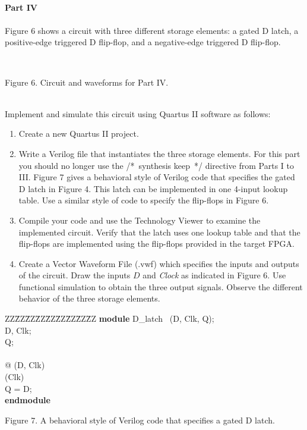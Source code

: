 \documentclass[epsfig,10pt,fullpage]{article}
\begin{document}
~\\
\noindent
{\bf Part IV}
~\\
~\\
\noindent
Figure 6 shows a circuit with three different storage elements: a gated D latch, 
a positive-edge triggered D flip-flop, and a negative-edge triggered D flip-flop.
~\\

\begin{figure}[H]
\scriptsize
\centerline{
\hbox{}}
\end{figure}
~\\
\centerline{Figure 6.  Circuit and waveforms for Part IV.}
~\\

\noindent
Implement and simulate this circuit using Quartus II software as follows:
\begin{enumerate}
\item Create a new Quartus II project. 
\item Write a Verilog file that instantiates the three storage elements. For this part you
should no longer use the /*~synthesis keep~*/ directive from Parts I to III. Figure 7
gives a behavioral style of Verilog code that specifies the gated D latch in Figure 4.
This latch can be implemented in one 4-input lookup table. Use a similar style of
code to specify the flip-flops in Figure 6.
\item Compile your code and use the Technology Viewer to examine the implemented circuit.
Verify that the latch uses one lookup table and that the flip-flops are implemented using
the flip-flops provided in the target FPGA.
\item Create a Vector Waveform File (.vwf) which specifies the inputs and outputs
of the circuit. Draw the inputs $D$ and {\it Clock} as indicated in Figure 6.
Use functional simulation to obtain the three output signals.
Observe the different behavior of the three storage elements.
\end{enumerate}

\begin{center}
\begin{minipage}[t]{12.5 cm}
\begin{tabbing}
ZZ\=ZZ\=ZZ\=ZZ\=ZZ\=ZZ\=ZZ\=ZZ\=ZZ\kill
{\bf module} D\_latch ~(D, Clk, Q);\\
 D, Clk;\\
 Q;\\
~\\
 @ (D, Clk)\\
\> (Clk)\\
\>\>\>Q = D;\\
{\bf endmodule}\\
\end{tabbing}
\end{minipage}
\end{center}
\begin{center}
Figure 7. A behavioral style of Verilog code that specifies a gated D latch.
\end{center}
\end{document}
